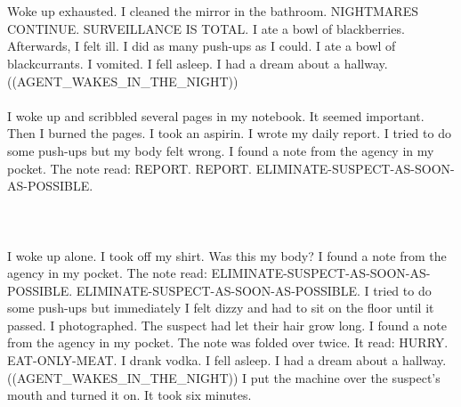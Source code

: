 \documentclass{article}
\begin{document}
    \section{}
    Woke up exhausted. I cleaned the mirror in the bathroom. NIGHTMARES CONTINUE. SURVEILLANCE IS TOTAL. I ate a bowl of blackberries. Afterwards, I felt ill. I did as many push-ups as I could. I ate a bowl of blackcurrants. I vomited. I fell asleep. I had a dream about a hallway. ((AGENT_WAKES_IN_THE_NIGHT)) \\\\I woke up and scribbled several pages in my notebook. It seemed important. Then I burned the pages. I took an aspirin. I wrote my daily report. I tried to do some push-ups but my body felt wrong. I found a note from the agency in my pocket. The note read: REPORT. REPORT. ELIMINATE-SUSPECT-AS-SOON-AS-POSSIBLE. \\\\
    \newpage
    
    \section{}
    I woke up alone. I took off my shirt. Was this my body? I found a note from the agency in my pocket. The note read: ELIMINATE-SUSPECT-AS-SOON-AS-POSSIBLE. ELIMINATE-SUSPECT-AS-SOON-AS-POSSIBLE. I tried to do some push-ups but immediately I felt dizzy and had to sit on the floor until it passed. I photographed. The suspect had let their hair grow long. I found a note from the agency in my pocket. The note was folded over twice. It read: HURRY. EAT-ONLY-MEAT. I drank vodka. I fell asleep. I had a dream about a hallway. ((AGENT_WAKES_IN_THE_NIGHT)) I put the machine over the suspect's mouth and turned it on. It took six minutes. \\\\
    \newpage
    
    
\end{document}
